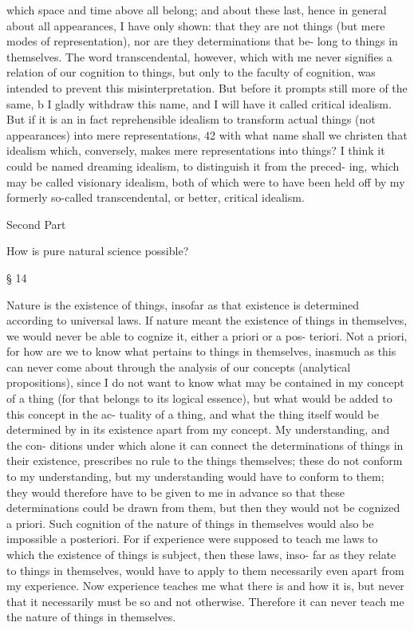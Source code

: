 which space and time above all belong; and about these last, hence in
general about all appearances, I have only shown: that they are not things
(but mere modes of representation), nor are they determinations that be-
long to things in themselves. The word transcendental, however, which
with me never signiﬁes a relation of our cognition to things, but only
to the faculty of cognition, was intended to prevent this misinterpretation.
But before it prompts still more of the same, b I gladly withdraw this
name, and I will have it called critical idealism. But if it is an in fact
reprehensible idealism to transform actual things (not appearances) into
mere representations, 42 with what name shall we christen that idealism
which, conversely, makes mere representations into things? I think it
could be named dreaming idealism, to distinguish it from the preced-
ing, which may be called visionary idealism, both of which were to have
been held off by my formerly so-called transcendental, or better, critical
idealism.

Second Part

How is pure natural science possible?

§ 14

Nature is the existence of things, insofar as that existence is determined
according to universal laws. If nature meant the existence of things in
themselves, we would never be able to cognize it, either a priori or a pos-
teriori. Not a priori, for how are we to know what pertains to things in
themselves, inasmuch as this can never come about through the analysis
of our concepts (analytical propositions), since I do not want to know
what may be contained in my concept of a thing (for that belongs to
its logical essence), but what would be added to this concept in the ac-
tuality of a thing, and what the thing itself would be determined by in
its existence apart from my concept. My understanding, and the con-
ditions under which alone it can connect the determinations of things
in their existence, prescribes no rule to the things themselves; these do
not conform to my understanding, but my understanding would have to
conform to them; they would therefore have to be given to me in advance
so that these determinations could be drawn from them, but then they
would not be cognized a priori.
Such cognition of the nature of things in themselves would also be
impossible a posteriori. For if experience were supposed to teach me
laws to which the existence of things is subject, then these laws, inso-
far as they relate to things in themselves, would have to apply to them
necessarily even apart from my experience. Now experience teaches me
what there is and how it is, but never that it necessarily must be so and
not otherwise. Therefore it can never teach me the nature of things in
themselves.

